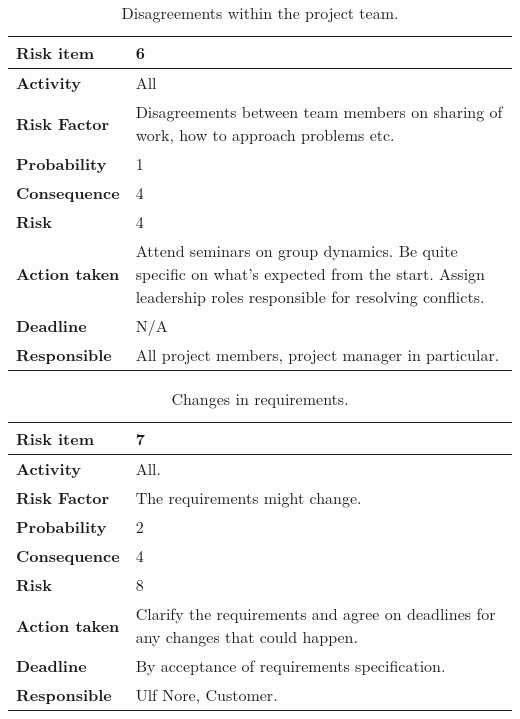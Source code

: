 \begin{table}[h!]
\begin{center}
\begin{tabularx}{\textwidth}{| X | X |}
\hline
\textbf{Risk item} & 6 \\
\hline
\textbf{Activity} & All \\
\hline
\textbf{Risk Factor} & Disagreements between team members on sharing of work, how to approach problems etc. \\
\hline
\textbf{Probability} & 1 \\
\hline
\textbf{Consequence} & 4 \\
\hline
\textbf{Risk} & 4 \\
\hline
\textbf{Action taken} & Attend seminars on group dynamics. Be quite specific on what's expected from the start. Assign leadership roles responsible for resolving conflicts. \\
\hline
\textbf{Deadline} & N/A \\
\hline
\textbf{Responsible} & All project members, project manager in particular. \\
\hline
\end{tabularx}
\caption{Disagreements within the project team.}
\end{center}
\label{risk_9}
\end{table}




\begin{table}[h!]
\begin{center}
\begin{tabularx}{\textwidth}{| X | X |}
\hline
\textbf{Risk item} & 7 \\
\hline
\textbf{Activity} & All. \\
\hline
\textbf{Risk Factor} & The requirements might change. \\
\hline
\textbf{Probability} & 2 \\
\hline
\textbf{Consequence} & 4 \\
\hline
\textbf{Risk} & 8 \\
\hline
\textbf{Action taken} & Clarify the requirements and agree on deadlines for any changes that could happen.\\
\hline
\textbf{Deadline} & By acceptance of requirements specification. \\
\hline
\textbf{Responsible} & Ulf Nore, Customer. \\
\hline
\end{tabularx}
\caption{Changes in requirements.}
\end{center}
\label{risk_1}
\end{table}


